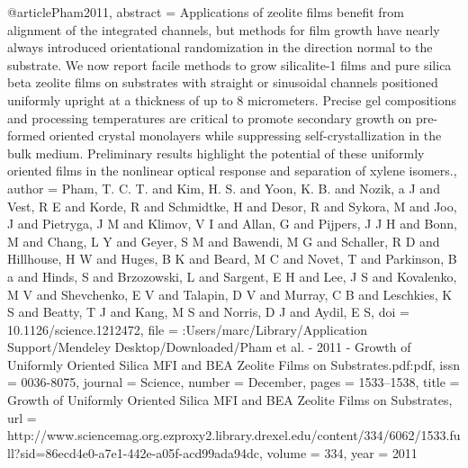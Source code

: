@article{Pham2011,
abstract = {Applications of zeolite films benefit from alignment of the integrated channels, but methods for film growth have nearly always introduced orientational randomization in the direction normal to the substrate. We now report facile methods to grow silicalite-1 films and pure silica beta zeolite films on substrates with straight or sinusoidal channels positioned uniformly upright at a thickness of up to 8 micrometers. Precise gel compositions and processing temperatures are critical to promote secondary growth on pre-formed oriented crystal monolayers while suppressing self-crystallization in the bulk medium. Preliminary results highlight the potential of these uniformly oriented films in the nonlinear optical response and separation of xylene isomers.},
author = {Pham, T. C. T. and Kim, H. S. and Yoon, K. B. and Nozik, a J and Vest, R E and Korde, R and Schmidtke, H and Desor, R and Sykora, M and Joo, J and Pietryga, J M and Klimov, V I and Allan, G and Pijpers, J J H and Bonn, M and Chang, L Y and Geyer, S M and Bawendi, M G and Schaller, R D and Hillhouse, H W and Huges, B K and Beard, M C and Novet, T and Parkinson, B a and Hinds, S and Brzozowski, L and Sargent, E H and Lee, J S and Kovalenko, M V and Shevchenko, E V and Talapin, D V and Murray, C B and Leschkies, K S and Beatty, T J and Kang, M S and Norris, D J and Aydil, E S},
doi = {10.1126/science.1212472},
file = {:Users/marc/Library/Application Support/Mendeley Desktop/Downloaded/Pham et al. - 2011 - Growth of Uniformly Oriented Silica MFI and BEA Zeolite Films on Substrates.pdf:pdf},
issn = {0036-8075},
journal = {Science},
number = {December},
pages = {1533--1538},
title = {{Growth of Uniformly Oriented Silica MFI and BEA Zeolite Films on Substrates}},
url = {http://www.sciencemag.org.ezproxy2.library.drexel.edu/content/334/6062/1533.full?sid=86ecd4e0-a7e1-442e-a05f-acd99ada94dc},
volume = {334},
year = {2011}
}
